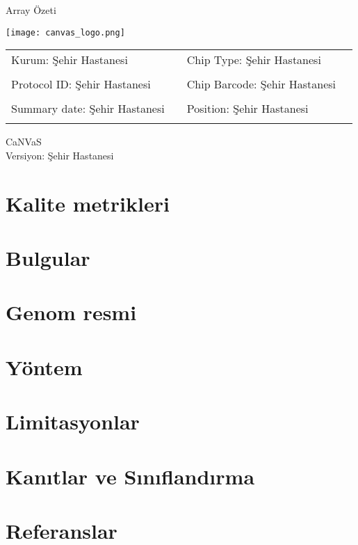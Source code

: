 \documentclass{article}
\newcommand{\institute}{Şehir Hastanesi}
\newcommand{\sampleId}{Şehir Hastanesi}
\newcommand{\summaryDate}{Şehir Hastanesi}
\newcommand{\chipId}{Şehir Hastanesi}
\newcommand{\chipPosition}{Şehir Hastanesi}
\newcommand{\chipType}{Şehir Hastanesi}
\newcommand{\canvasVersion}{Şehir Hastanesi}
\begin{document}
\shorthandoff{=}

\begin{titlepage}
\begin{center}
\Huge \textsf{Array Özeti}
\end{center}
\vspace*{2cm}
\begin{center}
\texttt{[image: canvas\_logo.png]}

\vspace*{4cm}

\begin{tabular}{l l l l}
\textsf{Kurum: \institute } & \hspace{1cm} & \textsf{Chip Type: \chipType} \\ \\
\textsf{Protocol ID: \sampleId} & \hspace{1cm} & \textsf{Chip Barcode: \chipId} \\ \\
\textsf{Summary date: \summaryDate} & \hspace{1cm} & \textsf{Position: \chipPosition} \\ \\
\end{tabular}

\vspace*{3cm}

\textsf{\LARGE CaNVaS} \\[0.5cm]
\textsf{Versiyon: \canvasVersion}
\end{center}
\end{titlepage}


\section{Kalite metrikleri}


\section{Bulgular}


\section{Genom resmi}


\section{Yöntem}

\section{Limitasyonlar}

\section{Kanıtlar ve Sınıflandırma}

\section{Referanslar}
\end{document}
